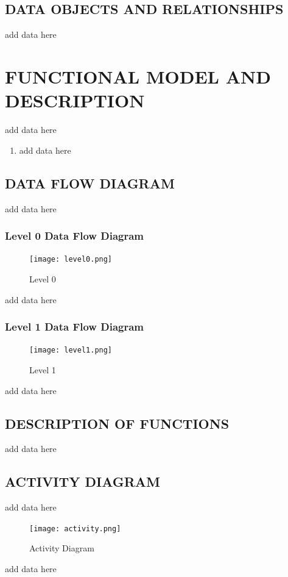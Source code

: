 \documentclass[12pt,a4paper]{report}
\begin{document}
\subsection{DATA OBJECTS AND RELATIONSHIPS}
add data here
\section{FUNCTIONAL MODEL AND DESCRIPTION}
add data here
\begin{enumerate}
\item add data here
\end{enumerate}


\subsection{DATA FLOW DIAGRAM}
add data here
\subsubsection{Level 0 Data Flow Diagram}
\begin{figure}[h]
\begin{center}
\texttt{[image: level0.png]}
\end{center}
\caption{Level 0}
\label{tab:l0}
\end{figure}
add data here 
\subsubsection{Level 1 Data Flow Diagram}
\begin{figure}[h]
\begin{center}
\texttt{[image: level1.png]}
\end{center}
\caption{Level 1}
\label{tab:l1}
\end{figure}
add data here
\subsection{DESCRIPTION OF FUNCTIONS}
add data here
\subsection{ACTIVITY DIAGRAM}
add data here
\begin{figure}[H]
\begin{center}
\texttt{[image: activity.png]}
\end{center}
\caption{Activity Diagram}
\label{tab:ad}
\end{figure}
add data here
\end{document}
